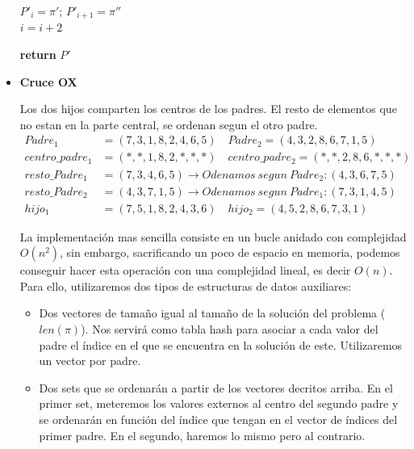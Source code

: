 \documentclass[a4paper, 12pt]{article}
\begin{document}
\begin{itemize}
\begin{algorithm}[H]
{{				$P'_i = \pi'$;\hspace*{0.5cm} $P'_{i+1} = \pi''$\\
         		
         		$i = i + 2$\\
         	}
                    
            
            \textbf{return} $P'$\\
         }
      \end{algorithm}

  		\newpage
      	\item \textbf{Cruce OX}
      	
      	Los dos hijos comparten los centros de los padres. El resto de elementos que no estan en la parte central, se ordenan segun el otro padre.
      	\begin{align*}
		Padre_1 &= (7,3,1,8,2,4,6,5) \quad Padre_2 = (4,3,2,8,6,7,1,5)\\
		centro\_padre_1 &= (*, *, 1, 8, 2, *, *, *) \quad centro\_padre_2 = (*, *, 2, 8, 6, *, *, *)\\
		resto\_Padre_1 &= (7,3,4,6,5) \rightarrow Odenamos\ segun\ Padre_2: (4,3,6,7,5)\\
		resto\_Padre_2 &= (4,3,7,1,5) \rightarrow Odenamos\ segun\ Padre_1: (7,3,1,4,5)\\
		hijo_1 &= (7,5,1,8,2,4,3,6)\quad hijo_2 = (4,5,2,8,6,7,3,1)
		\end{align*}
		
		La implementación mas sencilla consiste en un bucle anidado con complejidad $O(n^2)$, sin embargo, sacrificando un poco de espacio en memoria, podemos conseguir hacer esta operación con una complejidad lineal, es decir $O(n)$.\\
		
		Para ello, utilizaremos dos tipos de estructuras de datos auxiliares:
		\begin{itemize}
			\item Dos vectores de tamaño igual al tamaño de la solución del problema ($len(\pi)$). Nos servirá como tabla hash para asociar a cada valor del padre el índice en el que se encuentra en la solución de este. Utilizaremos un vector por padre.
			
			\item Dos sets que se ordenarán a partir de los vectores decritos arriba. En el primer set, meteremos los valores externos al centro del segundo padre y se ordenarán en función del índice que tengan en el vector de índices del primer padre. En el segundo, haremos lo mismo pero al contrario.\\
		\end{itemize}
		

\end{itemize}
\end{document}
